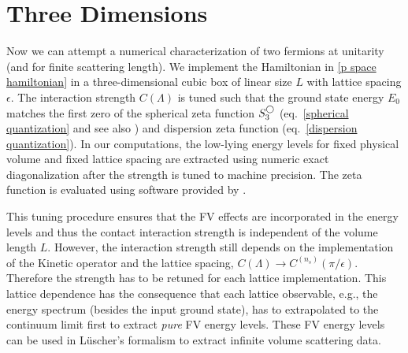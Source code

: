 \section{Three Dimensions}\label{sec:3D}


Now we can attempt a numerical characterization of two fermions at unitarity (and for finite scattering length).
We implement the Hamiltonian in \eqref{p space hamiltonian} in a three-dimensional cubic box of linear size $L$ with lattice spacing $\epsilon$.
The interaction strength $C(\Lambda)$ is tuned such that the ground state energy $E_0$ matches the first zero of the spherical zeta function $S^{\bigcirc}_3$ (eq.~\eqref{spherical quantization} and see also ) and dispersion zeta function (eq.~\eqref{dispersion quantization}).
In our computations, the low-lying energy levels for fixed physical volume and fixed lattice spacing are extracted using numeric exact diagonalization after the strength is tuned to machine precision.
The zeta function is evaluated using software provided by .

This tuning procedure ensures that the FV effects are incorporated in the energy levels and thus the contact interaction strength is independent of the volume length $L$.
However, the interaction strength still depends on the implementation of the Kinetic operator and the lattice spacing, $C(\Lambda)\to C^{(n_s)}(\pi/\epsilon)$.
Therefore the strength has to be retuned for each lattice implementation.
This lattice dependence has the consequence that each lattice observable, e.g., the energy spectrum (besides the input ground state), has to extrapolated to the continuum limit first to extract \textit{pure} FV energy levels.
These FV energy levels can be used in Lüscher's formalism to extract infinite volume scattering data.

